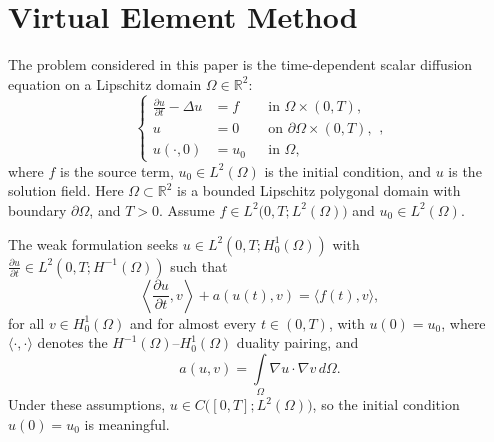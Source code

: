 \documentclass{article}
\begin{document}
\section{Virtual Element Method}
\label{sec:vem}

The problem considered in this paper is the time-dependent scalar diffusion equation on a Lipschitz domain $\Omega \in \mathbb{R}^2$:
\begin{equation}\label{eq:strong_formulation}
  \left\{ \begin{aligned}
    \frac{\partial u}{\partial t} - \Delta u &= f && \text{in } \Omega \times (0,T),\\
    u &= 0 && \text{on } \partial \Omega \times (0,T),\\
    u(\cdot, 0) &= u_0 && \text{in } \Omega,
  \end{aligned} \right. ,
\end{equation}
where $f$ is the source term, $u_0 \in L^2(\Omega)$ is the initial condition, and $u$ is the solution field. Here $\Omega\subset\mathbb{R}^2$ is a bounded Lipschitz polygonal domain with boundary $\partial\Omega$, and $T>0$. Assume $f\in L^2\big(0,T; L^2(\Omega)\big)$ and $u_0\in L^2(\Omega)$. 

The weak formulation seeks $u \in L^2(0,T;H^1_0(\Omega))$ with $\frac{\partial u}{\partial t} \in L^2(0,T;H^{-1}(\Omega))$ such that
\begin{equation}\label{eq:weak_formulation}
  \left\langle  \frac{\partial u}{\partial t}, v \right\rangle + a(u(t), v) = \langle f(t), v \rangle,
\end{equation}
for all $v \in H^1_0(\Omega)$ and for almost every $t\in (0,T)$, with $u(0)=u_0$, where $\langle \cdot, \cdot \rangle$ denotes the $H^{-1}(\Omega)$--$H^1_0(\Omega)$ duality pairing, and
\begin{equation}
    \nonumber
  a(u, v) = \int \limits_\Omega \nabla u \cdot \nabla v \, d\Omega.
\end{equation}
Under these assumptions, $u \in C\big([0,T]; L^2(\Omega)\big)$, so the initial condition $u(0)=u_0$ is meaningful.
\end{document}
